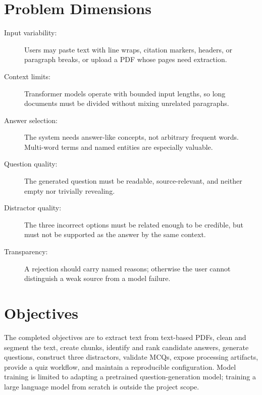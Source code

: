 \documentclass[12pt,a4paper]{report}
\begin{document}
\section{Problem Dimensions}
\begin{description}
\item[Input variability:] Users may paste text with line wraps, citation markers, headers, or paragraph breaks, or upload a PDF whose pages need extraction.
\item[Context limits:] Transformer models operate with bounded input lengths, so long documents must be divided without mixing unrelated paragraphs.
\item[Answer selection:] The system needs answer-like concepts, not arbitrary frequent words. Multi-word terms and named entities are especially valuable.
\item[Question quality:] The generated question must be readable, source-relevant, and neither empty nor trivially revealing.
\item[Distractor quality:] The three incorrect options must be related enough to be credible, but must not be supported as the answer by the same context.
\item[Transparency:] A rejection should carry named reasons; otherwise the user cannot distinguish a weak source from a model failure.
\end{description}

\section{Objectives}
The completed objectives are to extract text from text-based PDFs, clean and segment the text, create chunks, identify and rank candidate answers, generate questions, construct three distractors, validate MCQs, expose processing artifacts, provide a quiz workflow, and maintain a reproducible configuration. Model training is limited to adapting a pretrained question-generation model; training a large language model from scratch is outside the project scope.
\end{document}
